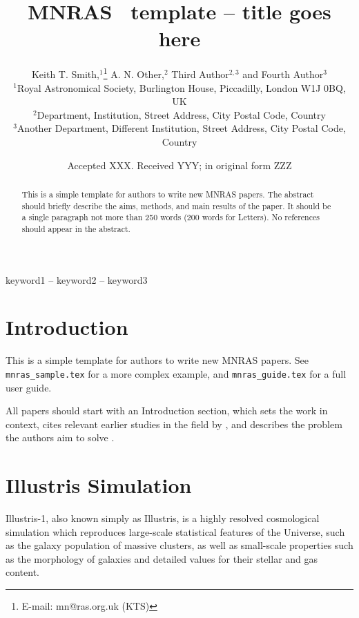 \documentclass[a4paper,fleqn,usenatbib]{mnras}
\title[Short title, max. 45 characters]{MNRAS \LaTeXe\ template -- title goes here}
\author[K. T. Smith et al.]{
Keith T. Smith,$^{1}$\thanks{E-mail: mn@ras.org.uk (KTS)}
A. N. Other,$^{2}$
Third Author$^{2,3}$
and Fourth Author$^{3}$
\\
$^{1}$Royal Astronomical Society, Burlington House, Piccadilly, London W1J 0BQ, UK\\
$^{2}$Department, Institution, Street Address, City Postal Code, Country\\
$^{3}$Another Department, Different Institution, Street Address, City Postal Code, Country
}
\date{Accepted XXX. Received YYY; in original form ZZZ}
\begin{document}
\label{firstpage}
\pagerange{\pageref{firstpage}--\pageref{lastpage}}
\maketitle

\begin{abstract}
This is a simple template for authors to write new MNRAS papers.
The abstract should briefly describe the aims, methods, and main results of the paper.
It should be a single paragraph not more than 250 words (200 words for Letters).
No references should appear in the abstract.
\end{abstract}

\begin{keywords}
keyword1 -- keyword2 -- keyword3
\end{keywords}



\section{Introduction}

This is a simple template for authors to write new MNRAS papers.
See \texttt{mnras\_sample.tex} for a more complex example, and \texttt{mnras\_guide.tex}
for a full user guide.

All papers should start with an Introduction section, which sets the work
in context, cites relevant earlier studies in the field by \citet{Others2013},
and describes the problem the authors aim to solve \citep[e.g.][]{Author2012}.

\section{Illustris Simulation}
Illustris-1, also known simply as Illustris, is a highly resolved cosmological simulation which reproduces large-scale statistical features of the Universe, such as the galaxy population of massive clusters, as well as small-scale properties such as the morphology of galaxies and detailed values for their stellar and gas content.\\
\end{document}
